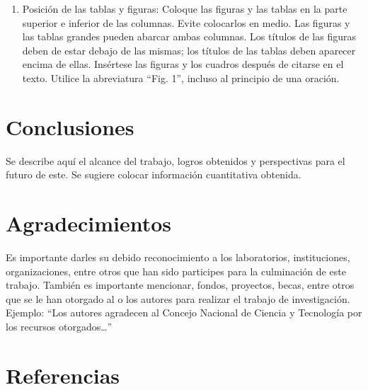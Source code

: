     \begin{enumerate}
        \item Posición de las tablas y figuras: Coloque las figuras y las tablas en la parte superior e inferior de las columnas. Evite colocarlos en medio. Las figuras y las tablas grandes pueden abarcar ambas columnas. Los títulos de las figuras deben de estar debajo de las mismas; los títulos de las tablas deben aparecer encima de ellas. Insértese las figuras y los cuadros después de citarse en el texto. Utilice la abreviatura “Fig. 1”, incluso al principio de una oración. 
    \end{enumerate}
    
    \section{Conclusiones}
    
    Se describe aquí el alcance del trabajo, logros obtenidos y perspectivas para el futuro de este. Se sugiere colocar información cuantitativa obtenida.
    
    \section{Agradecimientos}
    
    Es importante darles su debido reconocimiento a los laboratorios, instituciones, organizaciones, entre otros que han sido participes para la culminación de este trabajo. También es importante mencionar, fondos, proyectos, becas, entre otros que se le han otorgado al o los autores para realizar el trabajo de investigación. Ejemplo: “Los autores agradecen al Concejo Nacional de Ciencia y Tecnología por los recursos otorgados…”
    
    \section*{Referencias}
    
    
    
    

